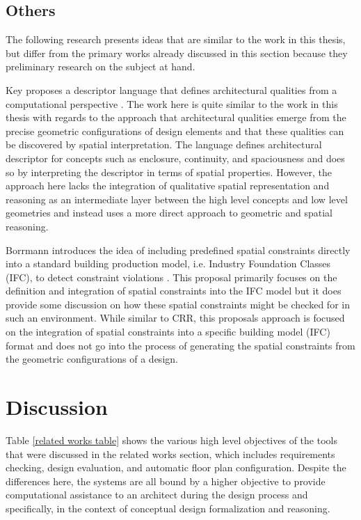 \documentclass[12pt]{ucthesis}
\begin{document}
\subsection{Others}
The following research presents ideas that are similar to the work in this thesis, but differ from the primary works already discussed in this section because they preliminary research on the subject at hand.

Key proposes a descriptor language that defines architectural qualities from a computational perspective \cite{Key}. The work here is quite similar to the work in this thesis with regards to the approach that architectural qualities emerge from the precise geometric configurations of design elements and that these qualities can be discovered by spatial interpretation. The language defines architectural descriptor for concepts such as enclosure, continuity, and spaciousness and does so by interpreting the descriptor in terms of spatial properties. However, the approach here lacks the integration of qualitative spatial representation and reasoning as an intermediate layer between the high level concepts and low level geometries and instead uses a more direct approach to geometric and spatial reasoning.

Borrmann introduces the idea of including predefined spatial constraints directly into a standard building production model, i.e. Industry Foundation Classes (IFC), to detect constraint violations \cite{Borrmann}. This proposal primarily focuses on the definition and integration of spatial constraints into the IFC model but it does provide some discussion on how these spatial constraints might be checked for in such an environment. While similar to CRR, this proposals approach is focused on the integration of spatial constraints into a specific building model (IFC) format and does not go into the process of generating the spatial constraints from the geometric configurations of a design. 

\section{Discussion}
Table \ref{related works table} shows the various high level objectives of the tools that were discussed in the related works section, which includes requirements checking, design evaluation, and automatic floor plan configuration. Despite the differences here, the systems are all bound by a higher objective to provide computational assistance to an architect during the design process and specifically, in the context of conceptual design formalization and reasoning.
\end{document}
